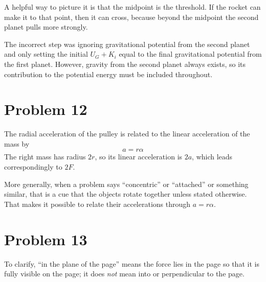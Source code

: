 \documentclass[11pt]{article}
\begin{document}
A helpful way to picture it is that the midpoint is the threshold. If the rocket can make it to that point, then it can cross, because beyond the midpoint the second planet pulls more strongly.

\begin{center}
\end{center}

The incorrect step was ignoring gravitational potential from the second planet and only setting the initial $U_G+K_i$ equal to the final gravitational potential from the first planet. However, gravity from the second planet always exists, so its contribution to the potential energy must be included throughout.

\section*{Problem 12}
The radial acceleration of the pulley is related to the linear acceleration of the mass by
\[
a=r\alpha
\]
The right mass has radius $2r$, so its linear acceleration is $2a$, which leads correspondingly to $2F$.

More generally, when a problem says ``concentric'' or ``attached'' or something similar, that is a cue that the objects rotate together unless stated otherwise. That makes it possible to relate their accelerations through $a=r\alpha$.

\section*{Problem 13}
\hspace*{\parindent} To clarify, ``in the plane of the page'' means the force lies in the page so that it is fully visible on the page; it does \emph{not} mean into or perpendicular to the page.
\end{document}
